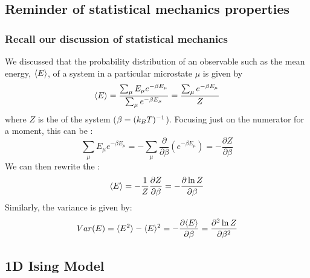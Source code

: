 \documentclass[hyperref={colorlinks=true}]{beamer}
\begin{document}
\subsection[Reminder of statistical mechanics properties]{Reminder of statistical mechanics properties}

\begin{frame}%
  \frametitle{Recall our discussion of statistical mechanics}
  
  We discussed that the probability distribution of an observable such as the mean energy, $\langle E \rangle$, of a system in a particular microstate $\mu$ is given by
%
  \begin{equation}
    \langle E \rangle = \frac{\sum_{\mu} E_{\mu} e^{-\beta E_{\mu}}}{{\sum_{\mu} e^{-\beta E_{\mu}}}} = \frac{{\sum_{\mu} e^{-\beta E_{\mu}}}}{Z}
  \end{equation}
%
where $Z$ is the  of the system ($\beta=(k_B T)^{-1}$). \pause Focusing just on the numerator for a moment, this can be : 
%
  \begin{equation}
    \sum_{\mu} E_{\mu} e^{-\beta E_{\mu}} = -\sum_{\mu} \frac{\partial}{\partial\beta}\left( e^{-\beta E_{\mu}} \right) =  -\frac{\partial Z}{\partial\beta} 
  \end{equation}
%  
  \pause We can then rewrite the :
%  
  \begin{equation}
    \langle E \rangle = -\frac{1}{Z}\frac{\partial Z}{\partial\beta} = -\frac{\partial \ln Z}{\partial\beta}         
  \end{equation} 
% 
 \pause Similarly, the variance is given by:
%
  \begin{equation}
    Var(E) = \langle E^2 \rangle - \langle E \rangle^2 = -\frac{\partial \langle E \rangle}{\partial\beta} = \frac{\partial^2 \ln Z}{\partial\beta^2}           
  \end{equation} 

\end{frame}

\subsection[1D Ising Model]{1D Ising Model}
\end{document}
